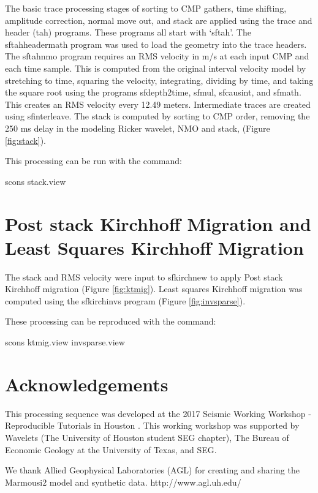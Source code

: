 The basic trace processing stages of sorting to CMP gathers, time shifting, 
amplitude correction, normal move out, and stack are applied using the trace 
and header (tah) programs.  These programs all start with ‘sftah’.  The 
sftahheadermath program was used to load the geometry into the trace headers.  
The sftahnmo program requires an RMS velocity in m/s at each input CMP and each 
time sample.  This is computed from the original interval velocity model by 
stretching to time, squaring the velocity, integrating, dividing by time, and 
taking the square root using the programs sfdepth2time, sfmul, sfcausint, and 
sfmath.  This creates an RMS velocity every 12.49 meters.  Intermediate traces 
are created using sfinterleave.  The stack is computed by sorting to CMP order,
removing the 250 ms delay in the modeling Ricker wavelet, NMO and stack, 
(Figure \ref{fig:stack}).

This processing can be run with the command:

scons stack.view 


\section{Post stack Kirchhoff Migration and Least Squares Kirchhoff Migration}

The stack and RMS velocity were input to sfkirchnew to apply Post stack
Kirchhoff migration (Figure \ref{fig:ktmig}).  Least squares Kirchhoff 
migration was computed using the sfkirchinvs program (Figure 
\ref{fig:invsparse}).  

These processing can be reproduced with the command:

scons ktmig.view invsparse.view


\section{Acknowledgements}
This processing sequence was developed at the 2017 Seismic Working Workshop - 
Reproducible Tutorials in Houston \cite[]{schleicher}.  This working workshop 
was supported by Wavelets (The University of Houston student SEG chapter), 
The Bureau of Economic Geology at the University of Texas, and SEG.

We thank Allied Geophysical Laboratories (AGL) for creating and sharing the 
Marmousi2 model and synthetic data.  http://www.agl.uh.edu/

